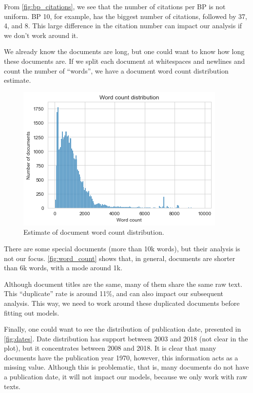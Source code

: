 \documentclass[twocolumn]{article}
\begin{document}
                  From \autoref{fig:bp_citations}, we see that the number of citations per BP is not uniform. BP 10, for example, has the biggest number of citations, followed by 37, 4, and 8. This large difference in the citation number can impact our analysis if we don't work around it.

                  We already know the documents are long, but one could want to know how long these documents are. If we split each document at whitespaces and newlines and count the number of ``words'', we have a document word count distribution estimate.

                  \begin{figure}[H]
                        \includegraphics[width=\linewidth]{word_count.png}
                        \caption{Estimate of document word count distribution.}
                        \label{fig:word_count}
                  \end{figure}

                  There are some special documents (more than 10k words), but their analysis is not our focus. \autoref{fig:word_count} shows that, in general, documents are shorter than 6k words, with a mode around 1k.

                  Although document titles are the same, many of them share the same raw text. This ``duplicate'' rate is around 11\%, and can also impact our subsequent analysis. This way, we need to work around these duplicated documents before fitting out models.

                  Finally, one could want to see the distribution of publication date, presented in \autoref{fig:dates}. Date distribution has support between 2003 and 2018 (not clear in the plot), but it concentrates between 2008 and 2018. It is clear that many documents have the publication year 1970, however, this information acts as a missing value. Although this is problematic, that is, many documents do not have a publication date, it will not impact our models, because we only work with raw texts.
\end{document}
